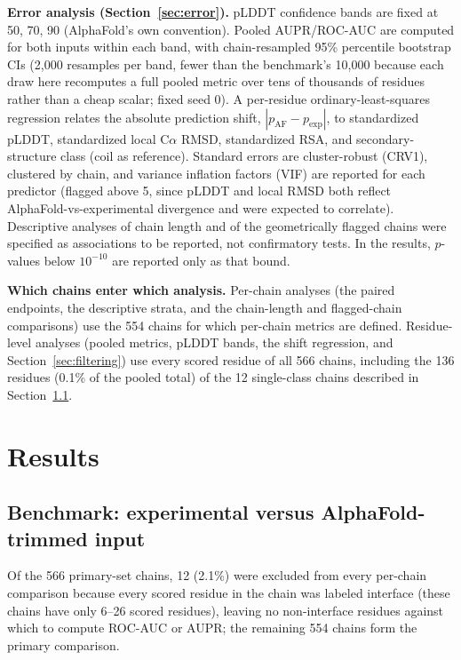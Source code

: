 \documentclass[10pt]{article}
\begin{document}
\textbf{Error analysis (Section~\ref{sec:error}).} pLDDT confidence bands are
fixed at 50, 70, 90 (AlphaFold's own convention). Pooled AUPR/ROC-AUC
are computed for both inputs within each band, with chain-resampled 95\%
percentile bootstrap CIs (2,000 resamples per band, fewer than
the benchmark's 10,000 because each draw here recomputes a full
pooled metric over tens of thousands of residues rather than a cheap scalar;
fixed seed 0). A per-residue ordinary-least-squares regression
relates the absolute prediction shift, $|p_{\mathrm{AF}} -
p_{\mathrm{exp}}|$, to standardized pLDDT, standardized local C$\alpha$ RMSD,
standardized RSA, and secondary-structure class (coil as reference). Standard
errors are cluster-robust (CRV1), clustered by chain, and variance inflation
factors (VIF) are reported for each predictor (flagged above
5, since pLDDT and local RMSD both reflect
AlphaFold-vs-experimental divergence and were expected to correlate).
Descriptive analyses of chain length and of the geometrically flagged chains
were specified as associations to be reported, not confirmatory tests. In
the results, $p$-values below $10^{-10}$ are reported only as that bound.

\textbf{Which chains enter which analysis.} Per-chain analyses (the paired
endpoints, the descriptive strata, and the chain-length and flagged-chain
comparisons) use the 554 chains for which per-chain metrics are
defined. Residue-level analyses (pooled metrics, pLDDT bands, the shift
regression, and Section~\ref{sec:filtering}) use every scored residue of all
566 chains, including the 136 residues
(0.1\% of the pooled total) of the 12 single-class
chains described in Section~\ref{sec:benchmark}.

\section{Results}
\label{sec:results}

\subsection{Benchmark: experimental versus AlphaFold-trimmed input}
\label{sec:benchmark}

Of the 566 primary-set chains, 12 (2.1\%)
were excluded from every per-chain comparison because every scored residue
in the chain was labeled interface (these chains have only
6--26 scored residues), leaving no non-interface
residues against which to compute ROC-AUC or AUPR; the remaining
554 chains form the primary comparison.
\end{document}
